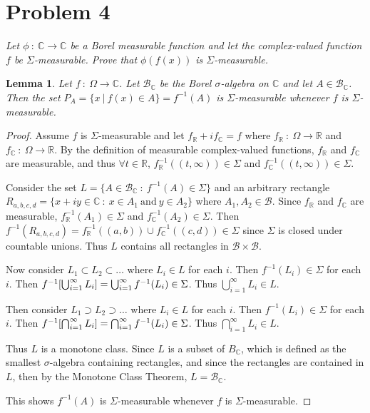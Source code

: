 \documentclass[12pt]{article}
\theoremstyle{plain}
\newtheorem{lemma}{Lemma}
\begin{document}
\section*{Problem 4}
\textit{Let $\phi\ :\ \mathbb{C} \rightarrow \mathbb{C}$ be a Borel measurable function and let the complex-valued function $f$ be $\Sigma$-measurable.  Prove that $\phi(f(x))$ is $\Sigma$-measurable.}

\begin{lemma}
    Let $f\ :\ \Omega \rightarrow \mathbb{C}$.  Let $\mathcal{B}_\mathbb{C}$ be the Borel $\sigma$-algebra on $\mathbb{C}$ and let $A \in \mathcal{B}_\mathbb{C}$.  Then the set $P_A = \{x\ |\ f(x) \in A\} = f^{-1}(A)$ is $\Sigma$-measurable whenever $f$ is $\Sigma$-measurable.
\end{lemma}
\begin{proof}
    Assume $f$ is $\Sigma$-measurable and let $f_\mathbb{R} + i f_\mathbb{C} = f$ where $f_\mathbb{R}\ :\ \Omega \rightarrow \mathbb{R}$ and $f_\mathbb{C}\ :\ \Omega \rightarrow \mathbb{R}$.  By the definition of measurable complex-valued functions, $f_\mathbb{R}$ and $f_\mathbb{C}$ are measurable, and thus $\forall t \in \mathbb{R}$, $f_\mathbb{R}^{-1}((t, \infty)) \in \Sigma$ and $f_\mathbb{C}^{-1}((t, \infty)) \in \Sigma$.

    Consider the set $L = \{A \in \mathcal{B}_\mathbb{C}\ :\ f^{-1}(A)\in\Sigma\}$ and an arbitrary rectangle $R_{a,b,c,d} = \{x + iy \in \mathbb{C}\ :\ x\in A_1\ \text{and}\ y\in A_2\}$ where $A_1, A_2 \in \mathcal{B}$.  Since $f_\mathbb{R}$ and $f_\mathbb{C}$ are measurable, $f_\mathbb{R}^{-1}(A_1) \in \Sigma$ and $f_\mathbb{C}^{-1}(A_2) \in \Sigma$.  Then $f^{-1}(R_{a,b,c,d}) = f_\mathbb{R}^{-1}((a,b)) \cup f_\mathbb{C}^{-1}((c,d)) \in \Sigma$ since $\Sigma$ is closed under countable unions.  Thus $L$ contains all rectangles in $\mathcal{B}\times\mathcal{B}$.

    Now consider $L_1 \subset L_2 \subset \dots$ where $L_i \in L$ for each $i$.  Then $f^{-1}(L_i) \in \Sigma$ for each $i$.  Then $f^{-1}\qty[\bigcup_{i=1}^\infty L_i] = \bigcup_{i=1}^\infty f^{-1}(L_i) \in \Sigma$.  Thus $\bigcup_{i=1}^\infty L_i \in L$.

    Then consider $L_1 \supset L_2 \supset \dots$ where $L_i \in L$ for each $i$.  Then $f^{-1}(L_i) \in \Sigma$ for each $i$.  Then $f^{-1}\qty[\bigcap_{i=1}^\infty L_i] = \bigcap_{i=1}^\infty f^{-1}(L_i) \in \Sigma$.  Thus $\bigcap_{i=1}^\infty L_i \in L$.

    Thus $L$ is a monotone class.  Since $L$ is a subset of $B_\mathbb{C}$, which is defined as the smallest $\sigma$-algebra containing rectangles, and since the rectangles are contained in $L$, then by the Monotone Class Theorem, $L = \mathcal{B}_\mathbb{C}$.

    This shows $f^{-1}(A)$ is $\Sigma$-measurable whenever $f$ is $\Sigma$-measurable.
\end{proof}
\end{document}

